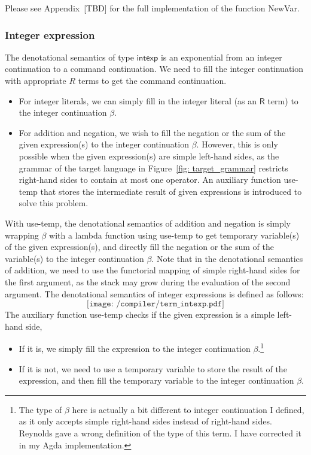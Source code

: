 \documentclass[12pt,a4paper]{report}
\theoremstyle{definition}
\begin{document}
        Please see Appendix~[TBD] for the full implementation of the function \textsf{NewVar}.

        \subsubsection{Integer expression} \label{subsubsec: compiler_intexp}
        The denotational semantics of type $\mathsf{intexp}$ is an exponential from an integer continuation to a command continuation. We need to fill the integer continuation with appropriate $R$ terms to get the command continuation. 
        \begin{itemize}
            \item For integer literals, we can simply fill in the integer literal (as an $\mathsf{R}$ term) to the integer continuation $\beta$.
            \item For addition and negation, we wish to fill the negation or the sum of the given expression(s) to the integer continuation $\beta$. However, this is only possible when the given expression(s) are simple left-hand sides, as the grammar of the target language in Figure~\ref{fig: target_grammar} restricts right-hand sides to contain at most one operator. An auxiliary function \textsf{use-temp} that stores the intermediate result of given expressions is introduced to solve this problem. 
        \end{itemize}
        With \textsf{use-temp}, the denotational semantics of addition and negation is simply wrapping $\beta$ with a lambda function using \textsf{use-temp} to get temporary variable(s) of the given expression(s), and directly fill the negation or the sum of the variable(s) to the integer continuation $\beta$. Note that in the denotational semantics of addition, we need to use the functorial mapping of simple right-hand sides for the first argument, as the stack may grow during the evaluation of the second argument. The denotational semantics of integer expressions is defined as follows:
        \[\texttt{[image: /compiler/term\_intexp.pdf]}\]
        The auxiliary function \textsf{use-temp} checks if the given expression is a simple left-hand side,
        \begin{itemize}
            \item If it is, we simply fill the expression to the integer continuation $\beta$.\footnote{The type of $\beta$ here is actually a bit different to integer continuation I defined, as it only accepts simple right-hand sides instead of right-hand sides. Reynolds gave a wrong definition of the type of this term. I have corrected it in my Agda implementation.}
            \item If it is not, we need to use a temporary variable to store the result of the expression, and then fill the temporary variable to the integer continuation $\beta$.
        \end{itemize}
\end{document}

